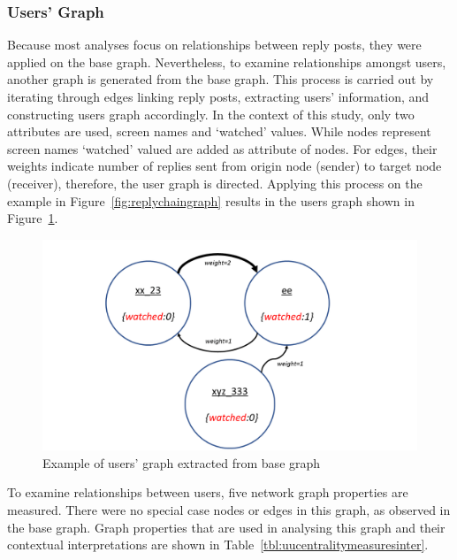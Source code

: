 \documentclass[sigconf]{acmart}
\begin{document}
\subsubsection{Users' Graph}

Because most analyses focus on relationships between reply posts, they
were applied on the base graph. Nevertheless, to examine relationships
amongst users, another graph is generated from the base graph. This
process is carried out by iterating through edges linking reply posts,
extracting users' information, and constructing users graph
accordingly. In the context of this study, only two attributes are used, 
screen names and `watched' values. While nodes represent screen names 
`watched' valued are added as attribute of nodes. For edges, their weights 
indicate number of replies sent from origin node (sender) to target
node (receiver), therefore, the user graph is directed. Applying this
process on the example in Figure~\ref{fig:replychaingraph} results in
the users graph shown in Figure~\ref{fig:usersgraph}.

\begin{figure}[htb]
\centering
\includegraphics[width=\columnwidth]{images/usersgraph.png}
\caption{Example of users' graph extracted from base graph}
\label{fig:usersgraph}
\end{figure}

To examine relationships between users, five network graph properties
are measured. There were no special case nodes or edges in this graph,
as observed in the base graph. Graph properties that are used in
analysing this graph and their contextual interpretations are shown in
Table~\ref{tbl:uucentralitymeasuresinter}.
\end{document}
